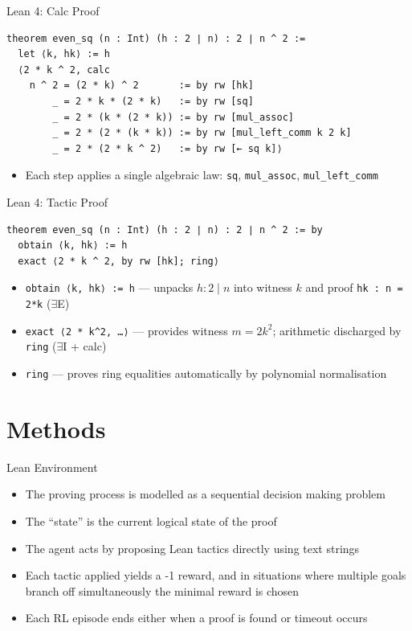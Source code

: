 \documentclass{beamer}
\begin{document}
\begin{frame}[fragile]{Lean 4: Calc Proof}
\begin{verbatim}
theorem even_sq (n : Int) (h : 2 ∣ n) : 2 ∣ n ^ 2 :=
  let ⟨k, hk⟩ := h
  ⟨2 * k ^ 2, calc
    n ^ 2 = (2 * k) ^ 2       := by rw [hk]
        _ = 2 * k * (2 * k)   := by rw [sq]
        _ = 2 * (k * (2 * k)) := by rw [mul_assoc]
        _ = 2 * (2 * (k * k)) := by rw [mul_left_comm k 2 k]
        _ = 2 * (2 * k ^ 2)   := by rw [← sq k]⟩
\end{verbatim}
\vspace{0.5em}
\begin{itemize}
  \small
  \item Each step applies a single algebraic law: \texttt{sq}, \texttt{mul\_assoc}, \texttt{mul\_left\_comm}
\end{itemize}
\end{frame}

\begin{frame}[fragile]{Lean 4: Tactic Proof}
\begin{verbatim}
theorem even_sq (n : Int) (h : 2 ∣ n) : 2 ∣ n ^ 2 := by
  obtain ⟨k, hk⟩ := h
  exact ⟨2 * k ^ 2, by rw [hk]; ring⟩
\end{verbatim}
\vspace{0.5em}
\begin{itemize}
  \small
  \item \texttt{obtain ⟨k, hk⟩ := h} --- unpacks $h : 2 \mid n$ into witness $k$ and proof \texttt{hk : n = 2*k} \hfill($\exists$E)
  \item \texttt{exact ⟨2 * k\^{}2, \ldots⟩} --- provides witness $m = 2k^2$; arithmetic discharged by \texttt{ring} \hfill($\exists$I + calc)
  \item \texttt{ring} --- proves ring equalities automatically by polynomial normalisation
\end{itemize}
\end{frame}

\section{Methods}

\begin{frame}{Lean Environment}
\begin{itemize}
\item The proving process is modelled as a sequential decision making problem
\item The ``state'' is the current logical state of the proof
\item The agent acts by proposing Lean tactics directly using text strings
\item Each tactic applied yields a -1 reward, and in situations where
multiple goals branch off simultaneously the minimal reward is chosen
\item Each RL episode ends either when a proof is found or timeout occurs
\end{itemize}
\end{frame}
\end{document}

